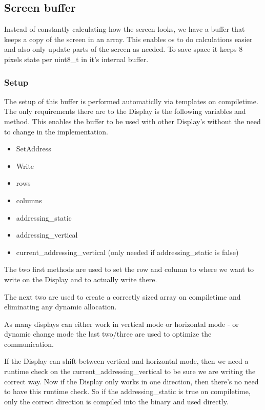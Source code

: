 \subsection{Screen buffer}

Instead of constantly calculating how the screen looks, we have a buffer that keeps a copy of the screen in an array. This enables os to do calculations easier and also only update parts of the screen as needed. To save space it keeps 8 pixels state per uint8\_t in it's internal buffer.

\subsubsection{Setup}

The setup of this buffer is performed automaticlly via templates on compiletime. The only requirements there are to the Display is the following variables and method. This enables the buffer to be used with other Display's without the need to change in the implementation.

\begin{itemize}
\item SetAddress
\item Write
\item rows
\item columns
\item addressing\_static
\item addressing\_vertical
\item current\_addressing\_vertical (only needed if addressing\_static is false)
\end{itemize}

The two first methods are used to set the row and column to where we want to write on the Display and to actually write there.

The next two are used to create a correctly sized array on compiletime and eliminating any dynamic allocation.

As many displays can either work in vertical mode or horizontal mode - or dynamic change mode the last two/three are used to optimize the communication.

If the Display can shift between vertical and horizontal mode, then we need a runtime check on the current\_addressing\_vertical to be sure we are writing the correct way. Now if the Display only works in one direction, then there's no need to have this runtime check. So if the addressing\_static is true on compiletime, only the correct direction is compiled into the binary and used directly.

